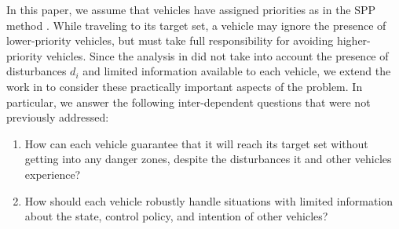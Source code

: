 In this paper, we assume that vehicles have assigned priorities as in the SPP method \cite{Chen15}. While traveling to its target set, a vehicle may ignore the presence of lower-priority vehicles, but must take full responsibility for avoiding higher-priority vehicles. Since the analysis in \cite{Chen15} did not take into account the presence of disturbances $d_i$ and limited information available to each vehicle, we extend the work in \cite{Chen15} to consider these practically important aspects of the problem. In particular, we answer the following inter-dependent questions that were not previously addressed:
\begin{enumerate}
\item How can each vehicle guarantee that it will reach its target set without getting into any danger zones, despite the disturbances it and other vehicles experience?
\item How should each vehicle robustly handle situations with limited information about the state, control policy, and intention of other vehicles?
\end{enumerate}
%
